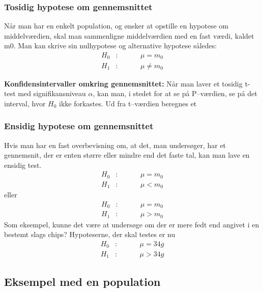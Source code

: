\documentclass[11pt]{article}
\begin{document}
\subsubsection{Tosidig hypotese om gennemsnittet}
Når man har en enkelt population, og ønsker at opstille en hypotese om middelværdien, skal man sammenligne middelværdien med en fast værdi, kaldet m0. Man kan skrive sin nulhypotese og alternative hypotese således:
\begin{eqnarray*}
H_0&:&\hspace{1cm}\mu =m_0\\
H_1&:&\hspace{1cm}\mu \neq m_0
\end{eqnarray*}
 	
\textbf{Konfidensintervaller omkring gennemsnittet:} Når man laver et tosidig t-test med signifikansniveau $\alpha$, kan man, i stedet for at se på P--værdien, se på det interval, hvor $H_0$ ikke forkastes. Ud fra t--værdien beregnes et 

\subsubsection{Ensidig hypotese om gennemsnittet}
Hvis man har en fast overbevisning om, at det, man undersøger, har et gennemsnit, der er enten større eller mindre end det faste tal, kan man lave en ensidig test.\begin{eqnarray*}
H_0&:&\hspace{1cm}\mu =m_0\\
H_1&:&\hspace{1cm}\mu < m_0
\end{eqnarray*}
eller
\begin{eqnarray*}
H_0&:&\hspace{1cm}\mu =m_0\\
H_1&:&\hspace{1cm}\mu > m_0
\end{eqnarray*}
Som eksempel, kunne det være at undersøge om der er mere fedt end angivet i en bestemt slags chips? Hypoteserne, der skal testes er nu
\begin{eqnarray*}
H_0&:&\hspace{1cm}\mu = 34g\\
H_1&:&\hspace{1cm}\mu > 34g
\end{eqnarray*}

\subsection{Eksempel med en population}
\end{document}
